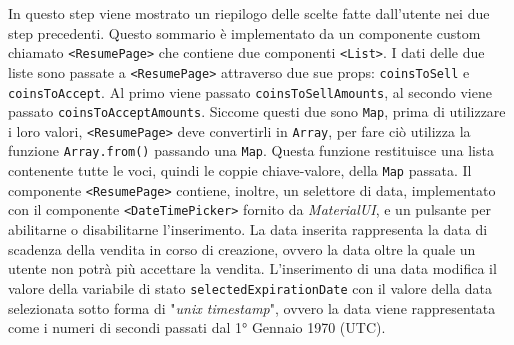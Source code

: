 \documentclass[a4paper]{article}
\begin{document}
        In questo step viene mostrato un riepilogo delle scelte fatte dall'utente nei due step precedenti. Questo sommario è implementato da un componente custom chiamato \verb|<ResumePage>| che contiene due componenti \verb|<List>|.
        I dati delle due liste sono passate a \verb|<ResumePage>| attraverso due sue props: \verb|coinsToSell| e \verb|coinsToAccept|. Al primo viene passato \verb|coinsToSellAmounts|, al secondo viene passato \verb|coinsToAcceptAmounts|.
        Siccome questi due sono \verb|Map|, prima di utilizzare i loro valori, \verb|<ResumePage>| deve convertirli in \verb|Array|, per fare ciò utilizza la funzione \verb|Array.from()| passando una \verb|Map|.
        Questa funzione restituisce una lista contenente tutte le voci, quindi le coppie chiave-valore, della \verb|Map| passata.
        \newline
        Il componente \verb|<ResumePage>| contiene, inoltre, un selettore di data, implementato con il componente \verb|<DateTimePicker>| fornito da \emph{MaterialUI}, e un pulsante per abilitarne o disabilitarne l'inserimento.
        La data inserita rappresenta la data di scadenza della vendita in corso di creazione, ovvero la data oltre la quale un utente non potrà più accettare la vendita. L'inserimento di una data modifica il valore della variabile di stato \verb|selectedExpirationDate| con il
        valore della data selezionata sotto forma di "\emph{unix timestamp}", ovvero la data viene rappresentata come i numeri di secondi passati dal 1° Gennaio 1970 (UTC).
\end{document}
